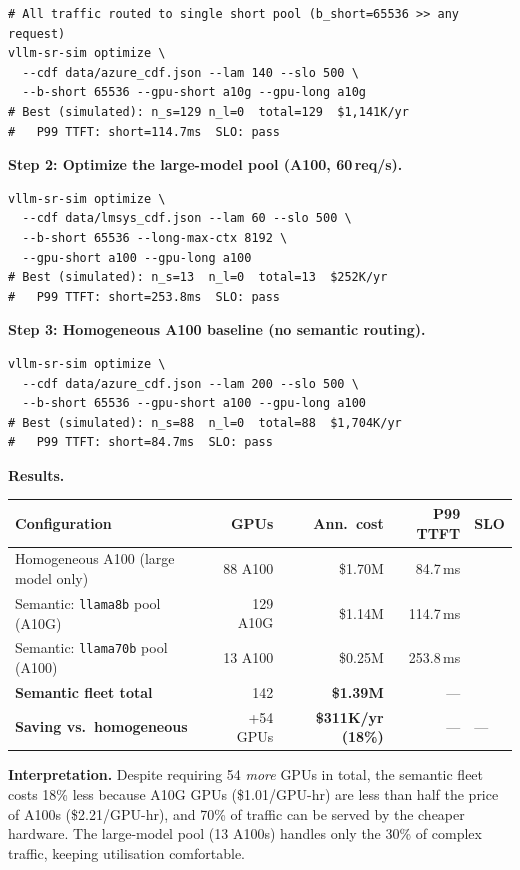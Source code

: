 \documentclass[11pt,a4paper]{article}
\begin{document}
\begin{lstlisting}[style=shell]
# All traffic routed to single short pool (b_short=65536 >> any request)
vllm-sr-sim optimize \
  --cdf data/azure_cdf.json --lam 140 --slo 500 \
  --b-short 65536 --gpu-short a10g --gpu-long a10g
# Best (simulated): n_s=129 n_l=0  total=129  $1,141K/yr
#   P99 TTFT: short=114.7ms  SLO: pass
\end{lstlisting}

\textbf{Step 2: Optimize the large-model pool (A100, 60\,req/s).}

\begin{lstlisting}[style=shell]
vllm-sr-sim optimize \
  --cdf data/lmsys_cdf.json --lam 60 --slo 500 \
  --b-short 65536 --long-max-ctx 8192 \
  --gpu-short a100 --gpu-long a100
# Best (simulated): n_s=13  n_l=0  total=13  $252K/yr
#   P99 TTFT: short=253.8ms  SLO: pass
\end{lstlisting}

\textbf{Step 3: Homogeneous A100 baseline (no semantic routing).}

\begin{lstlisting}[style=shell]
vllm-sr-sim optimize \
  --cdf data/azure_cdf.json --lam 200 --slo 500 \
  --b-short 65536 --gpu-short a100 --gpu-long a100
# Best (simulated): n_s=88  n_l=0  total=88  $1,704K/yr
#   P99 TTFT: short=84.7ms  SLO: pass
\end{lstlisting}

\textbf{Results.}
\begin{center}
\begin{tabular}{lrrrl}
\toprule
Configuration & GPUs & Ann.\ cost & P99 TTFT & SLO \\
\midrule
Homogeneous A100 (large model only) & 88 A100 & \$1.70M & 84.7\,ms & \checkmark \\
Semantic: \texttt{llama8b} pool (A10G) & 129 A10G & \$1.14M & 114.7\,ms & \checkmark \\
Semantic: \texttt{llama70b} pool (A100) & 13 A100 & \$0.25M & 253.8\,ms & \checkmark \\
\midrule
\textbf{Semantic fleet total} & 142 & \textbf{\$1.39M} & --- & \checkmark \\
\textbf{Saving vs.\ homogeneous} & +54 GPUs & \textbf{\$311K/yr (18\%)} & --- & --- \\
\bottomrule
\end{tabular}
\end{center}

\textbf{Interpretation.}  Despite requiring 54 \emph{more} GPUs in total,
the semantic fleet costs 18\% less because A10G GPUs (\$1.01/GPU-hr) are
less than half the price of A100s (\$2.21/GPU-hr), and 70\% of traffic can
be served by the cheaper hardware.  The large-model pool (13 A100s) handles
only the 30\% of complex traffic, keeping utilisation comfortable.
\end{document}
